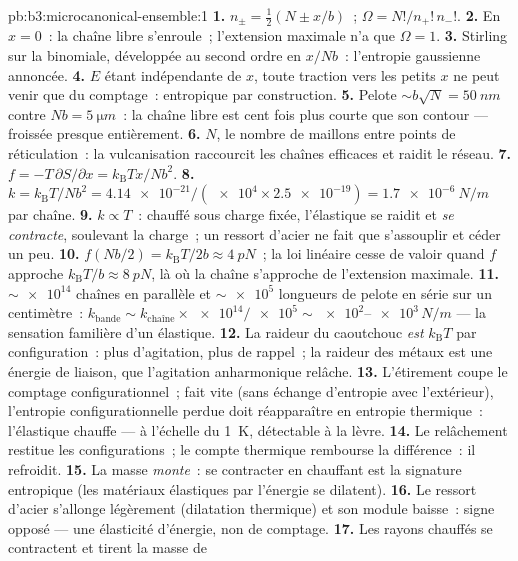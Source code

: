 \begin{solution}{pb:b3:microcanonical-ensemble:1}
\textbf{1.} $n_\pm = \tfrac12(N \pm x/b)$~; $\Omega =
N!/n_+!\,n_-!$.
\textbf{2.} En $x = 0$~: la chaîne libre s'enroule~; l'extension
maximale n'a que $\Omega = 1$.
\textbf{3.} Stirling sur la binomiale, développée au second ordre en
$x/Nb$~: l'entropie gaussienne annoncée.
\textbf{4.} $E$ étant indépendante de $x$, toute traction vers les
petits $x$ ne peut venir que du comptage~: entropique par
construction.
\textbf{5.} Pelote $\sim b\sqrt N = \qty{50}{nm}$ contre $Nb =
\qty{5}{\micro m}$~: la chaîne libre est cent fois plus courte que son
contour --- froissée presque entièrement.
\textbf{6.} $N$, le nombre de maillons entre points de réticulation~:
la vulcanisation raccourcit les chaînes efficaces et raidit le réseau.
\textbf{7.} $f = -T\,\partial S/\partial x =
k_{\text{B}}Tx/Nb^2$.
\textbf{8.} $k = k_{\text{B}}T/Nb^2 = \num{4.14e-21}/(\num{e4}
\times \num{2.5e-19}) = \qty{1.7e-6}{N/m}$ par chaîne.
\textbf{9.} $k \propto T$~: chauffé sous charge fixée, l'élastique se
raidit et \emph{se contracte}, soulevant la charge~; un ressort
d'acier ne fait que s'assouplir et céder un peu.
\textbf{10.} $f(Nb/2) = k_{\text{B}}T/2b \approx \qty{4}{pN}$~; la
loi linéaire cesse de valoir quand $f$ approche $k_{\text{B}}T/b \approx
\qty{8}{pN}$, là où la chaîne s'approche de l'extension maximale.
\textbf{11.} $\sim\num{e14}$ chaînes en parallèle et
$\sim\num{e5}$ longueurs de pelote en série sur un centimètre~:
$k_{\text{bande}} \sim k_{\text{chaîne}} \times \num{e14}/\num{e5}
\sim \num{e2}$--$\num{e3}\,\unit{N/m}$ --- la sensation familière
d'un élastique.
\textbf{12.} La raideur du caoutchouc \emph{est} $k_{\text{B}}T$ par
configuration~: plus d'agitation, plus de rappel~; la raideur des
métaux est une énergie de liaison, que l'agitation anharmonique
relâche.
\textbf{13.} L'étirement coupe le comptage configurationnel~; fait
vite (sans échange d'entropie avec l'extérieur), l'entropie
configurationnelle perdue doit réapparaître en entropie thermique~:
l'élastique chauffe --- à l'échelle du \qty{1}{K}, détectable à la
lèvre.
\textbf{14.} Le relâchement restitue les configurations~; le compte
thermique rembourse la différence~: il refroidit.
\textbf{15.} La masse \emph{monte}~: se contracter en chauffant est la
signature entropique (les matériaux élastiques par l'énergie se
dilatent).
\textbf{16.} Le ressort d'acier s'allonge légèrement (dilatation
thermique) et son module baisse~: signe opposé --- une élasticité
d'énergie, non de comptage.
\textbf{17.} Les rayons chauffés se contractent et tirent la masse de

\end{solution}
